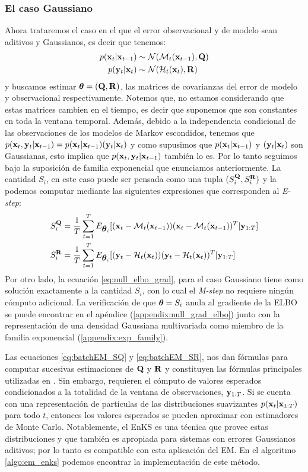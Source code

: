 \subsubsection*{El caso Gaussiano}
Ahora trataremos el caso en el que el error observacional y de modelo sean aditivos y Gaussianos, es decir que tenemos:
\begin{align}
    p(\mathbf{x}_t | \mathbf{x}_{t-1}) &\sim \mathcal{N}(\mathcal{M}_t(\mathbf{x}_{t-1}), \mathbf{Q}) \\
    p(\mathbf{y}_t | \mathbf{x}_t) &\sim \mathcal{N}(\mathcal{H}_t(\mathbf{x}_t), \mathbf{R})
\end{align}
y buscamos estimar $\mbox{\boldmath$ \theta $} = (\mathbf{Q}, \mathbf{R})$, las matrices de covarianzas del error de modelo y observacional respectivamente. Notemos que, no estamos considerando que estas matrices cambien en el tiempo, es decir que suponemos que son constantes en toda la ventana temporal. Además, debido a la independencia condicional de las observaciones de los modelos de Markov escondidos, tenemos que $p(\mathbf{x}_t, \mathbf{y}_t | \mathbf{x}_{t-1}) = p(\mathbf{x}_t | \mathbf{x}_{t-1}) (\mathbf{y}_t | \mathbf{x}_t)$ y como supusimos que $p(\mathbf{x}_t | \mathbf{x}_{t-1})$ y $(\mathbf{y}_t | \mathbf{x}_t)$ son Gaussianas, esto implica que $p(\mathbf{x}_t, \mathbf{y}_t | \mathbf{x}_{t-1})$ también lo es. Por lo tanto seguimos bajo la suposición de familia exponencial que enunciamos anteriormente. La cantidad $S_i$, en este caso puede ser pensada como una tupla $(S_i^{\mathbf{Q}}, S_i^{\mathbf{R}})$ y la podemos computar mediante las siguientes expresiones que corresponden al \textit{E-step}:
\begin{align}
    S_i^{\mathbf{Q}} &= \frac{1}{T}\sum_{t=1}^T E_{\mbox{\boldmath$ \theta $}_i}[(\mathbf{x}_t - \mathcal{M}_t(\mathbf{x}_{t-1}))(\mathbf{x}_t - \mathcal{M}_t(\mathbf{x}_{t-1}))^T | \mathbf{y}_{1:T}] \label{eq:batchEM_SQ} \\
    S_i^{\mathbf{R}} &= \frac{1}{T}\sum_{t=1}^T E_{\mbox{\boldmath$ \theta $}_i}[(\mathbf{y}_t - \mathcal{H}_t(\mathbf{x}_t))(\mathbf{y}_t - \mathcal{H}_t(\mathbf{x}_t))^T | \mathbf{y}_{1:T}] \label{eq:batchEM_SR}
\end{align}
Por otro lado, la ecuación \ref{eq:null_elbo_grad}, para el caso Gaussiano tiene como solución exactamente a la cantidad $S_i$, con lo cual el \textit{M-step} no requiere ningún cómputo adicional. La verificación de que $\mbox{\boldmath$ \theta $} = S_i$ anula al gradiente de la ELBO se puede encontrar en el apéndice (\ref{appendix:null_grad_elbo}) junto con la representación de una densidad Gaussiana multivariada como miembro de la familia exponencial (\ref{appendix:exp_family}).

Las ecuaciones \ref{eq:batchEM_SQ} y \ref{eq:batchEM_SR}, nos dan fórmulas para computar sucesivas estimaciones de $\mathbf{Q}$ y $\mathbf{R}$ y constituyen las fórmulas principales utilizadas en \cite{Tandeo2015, Dreano2017, Pulido2018}. Sin embargo, requieren el cómputo de valores esperados condicionados a la totalidad de la ventana de observaciones, $\mathbf{y}_{1:T}$. Si se cuenta con una representación de partículas de las distribuciones suavizantes $p(\mathbf{x}_t | \mathbf{x}_{1:T})$ para todo $t$, entonces los valores esperados se pueden aproximar con estimadores de Monte Carlo. Notablemente, el EnKS es una técnica que provee estas distribuciones y que también es apropiada para sistemas con errores Gaussianos aditivos; por lo tanto es compatible con esta aplicación del EM. En el algoritmo \ref{algo:em_enks} podemos encontrar la implementación de este método.

